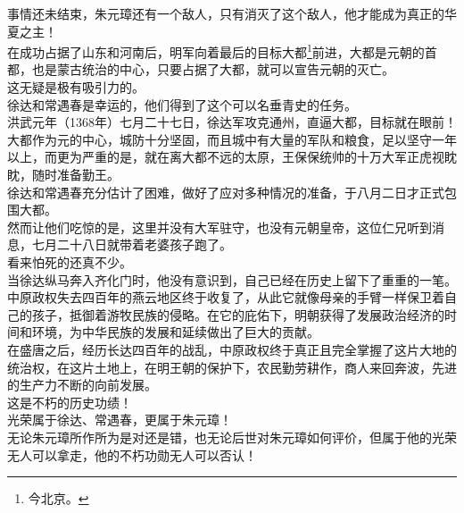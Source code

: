 \begin{multicols}{\theparacolNo}
事情还未结束，朱元璋还有一个敌人，只有消灭了这个敌人，他才能成为真正的华夏之主！\\

在成功占据了山东和河南后，明军向着最后的目标大都\footnote{今北京。}前进，大都是元朝的首都，也是蒙古统治的中心，只要占据了大都，就可以宣告元朝的灭亡。\\

这无疑是极有吸引力的。\\

徐达和常遇春是幸运的，他们得到了这个可以名垂青史的任务。\\

洪武元年（1368年）七月二十七日，徐达军攻克通州，直逼大都，目标就在眼前！\\

大都作为元的中心，城防十分坚固，而且城中有大量的军队和粮食，足以坚守一年以上，而更为严重的是，就在离大都不远的太原，王保保统帅的十万大军正虎视眈眈，随时准备勤王。\\

徐达和常遇春充分估计了困难，做好了应对多种情况的准备，于八月二日才正式包围大都。\\

然而让他们吃惊的是，这里并没有大军驻守，也没有元朝皇帝，这位仁兄听到消息，七月二十八日就带着老婆孩子跑了。\\

看来怕死的还真不少。\\

当徐达纵马奔入齐化门时，他没有意识到，自己已经在历史上留下了重重的一笔。\\

中原政权失去四百年的燕云地区终于收复了，从此它就像母亲的手臂一样保卫着自己的孩子，抵御着游牧民族的侵略。在它的庇佑下，明朝获得了发展政治经济的时间和环境，为中华民族的发展和延续做出了巨大的贡献。\\

在盛唐之后，经历长达四百年的战乱，中原政权终于真正且完全掌握了这片大地的统治权，在这片土地上，在明王朝的保护下，农民勤劳耕作，商人来回奔波，先进的生产力不断的向前发展。\\

这是不朽的历史功绩！\\

光荣属于徐达、常遇春，更属于朱元璋！\\

无论朱元璋所作所为是对还是错，也无论后世对朱元璋如何评价，但属于他的光荣无人可以拿走，他的不朽功勋无人可以否认！\\


\end{multicols}
